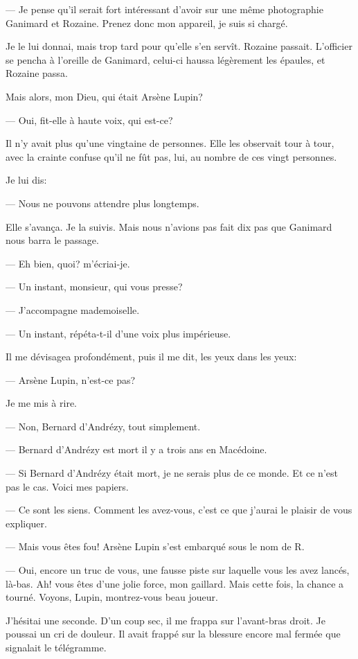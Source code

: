 \documentclass[12pt,a4paper]{book}
\begin{document}
— Je pense qu’il serait fort intéressant d’avoir sur une même photographie Ganimard et Rozaine. Prenez donc mon appareil, je suis si chargé.

Je le lui donnai, mais trop tard pour qu’elle s’en servît. Rozaine passait. L’officier se pencha à l’oreille de Ganimard, celui-ci haussa légèrement les épaules, et Rozaine passa.

Mais alors, mon Dieu, qui était Arsène Lupin?

— Oui, fit-elle à haute voix, qui est-ce? 

Il n’y avait plus qu’une vingtaine de personnes. Elle les observait tour à tour, avec la crainte confuse qu’il ne fût pas, lui, au nombre de ces vingt personnes.

Je lui dis:

— Nous ne pouvons attendre plus longtemps.

Elle s’avança. Je la suivis. Mais nous n’avions pas fait dix pas que Ganimard nous barra le passage.

— Eh bien, quoi? m’écriai-je.

— Un instant, monsieur, qui vous presse?

— J’accompagne mademoiselle.

— Un instant, répéta-t-il d’une voix plus impérieuse.

Il me dévisagea profondément, puis il me dit, les yeux dans les yeux:

— Arsène Lupin, n’est-ce pas?

Je me mis à rire.

— Non, Bernard d’Andrézy, tout simplement.

— Bernard d’Andrézy est mort il y a trois ans en Macédoine.

— Si Bernard d’Andrézy était mort, je ne serais plus de ce monde. Et ce n’est pas le cas. Voici mes papiers.

— Ce sont les siens. Comment les avez-vous, c’est ce que j’aurai le plaisir de vous expliquer.

— Mais vous êtes fou! Arsène Lupin s’est embarqué sous le nom de R. 

— Oui, encore un truc de vous, une fausse piste sur laquelle vous les avez lancés, là-bas. Ah! vous êtes d’une jolie force, mon gaillard. Mais cette fois, la chance a tourné. Voyons, Lupin, montrez-vous beau joueur.

J’hésitai une seconde. D’un coup sec, il me frappa sur l’avant-bras droit. Je poussai un cri de douleur. Il avait frappé sur la blessure encore mal fermée que signalait le télégramme.
\end{document}

